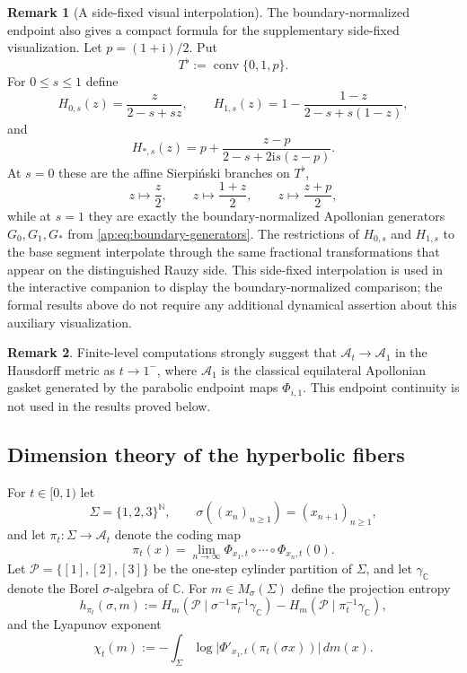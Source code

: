 \documentclass[11pt]{amsart}
\theoremstyle{definition}
\newtheorem{remark}[remark]{Remark}
\newcommand{\C}{\mathbb{C}}
\newcommand{\ii}{\mathrm{i}}
\begin{document}
\begin{remark}[A side-fixed visual interpolation]\label{ap:rem:side-fixed-interpolation}
The boundary-normalized endpoint also gives a compact formula for the supplementary side-fixed visualization.  Let $p=(1+\ii)/2$. Put
\[
  T^{\flat}:=\operatorname{conv}\{0,1,p\}.
\]
For $0\le s\le1$ define
\[
  H_{0,s}(z)=\frac{z}{2-s+sz},
  \qquad
  H_{1,s}(z)=1-\frac{1-z}{2-s+s(1-z)},
\]
and
\[
  H_{\ast,s}(z)
  =p+\frac{z-p}{2-s+2\ii s(z-p)}.
\]
At $s=0$ these are the affine Sierpi\'nski branches on $T^{\flat}$,
\[
  z\mapsto \frac z2,
  \qquad
  z\mapsto \frac{1+z}{2},
  \qquad
  z\mapsto \frac{z+p}{2},
\]
while at $s=1$ they are exactly the boundary-normalized Apollonian generators $G_0,G_1,G_\ast$ from \eqref{ap:eq:boundary-generators}.  The restrictions of $H_{0,s}$ and $H_{1,s}$ to the base segment interpolate through the same fractional transformations that appear on the distinguished Rauzy side.  This side-fixed interpolation is used in the interactive companion to display the boundary-normalized comparison; the formal results above do not require any additional dynamical assertion about this auxiliary visualization.
\end{remark}

\begin{remark}
Finite-level computations strongly suggest that $\mathcal A_t\to \mathcal A_1$ in the Hausdorff metric as $t\to1^{-}$, where $\mathcal A_1$ is the classical equilateral Apollonian gasket generated by the parabolic endpoint maps $\Phi_{i,1}$. This endpoint continuity is not used in the results proved below.
\end{remark}

\subsection{Dimension theory of the hyperbolic fibers}
For $t\in[0,1)$ let
\[
  \Sigma=\{1,2,3\}^{\mathbb N},
  \qquad
  \sigma((x_n)_{n\ge1})=(x_{n+1})_{n\ge1},
\]
and let $\pi_t:\Sigma\to \mathcal A_t$ denote the coding map
\[
  \pi_t(x)=\lim_{n\to\infty} \Phi_{x_1,t}\circ\cdots\circ\Phi_{x_n,t}(0).
\]
Let $\mathcal P=\{[1],[2],[3]\}$ be the one-step cylinder partition of $\Sigma$, and let $\gamma_{\C}$ denote the Borel $\sigma$-algebra of $\C$. For $m\in M_\sigma(\Sigma)$ define the projection entropy
\[
  h_{\pi_t}(\sigma,m)
  := H_m(\mathcal P\mid \sigma^{-1}\pi_t^{-1}\gamma_{\C})
   - H_m(\mathcal P\mid \pi_t^{-1}\gamma_{\C}),
\]
and the Lyapunov exponent
\[
  \chi_t(m)
  := -\int_\Sigma \log\bigl|\Phi'_{x_1,t}(\pi_t(\sigma x))\bigr|\,dm(x).
\]
\end{document}
